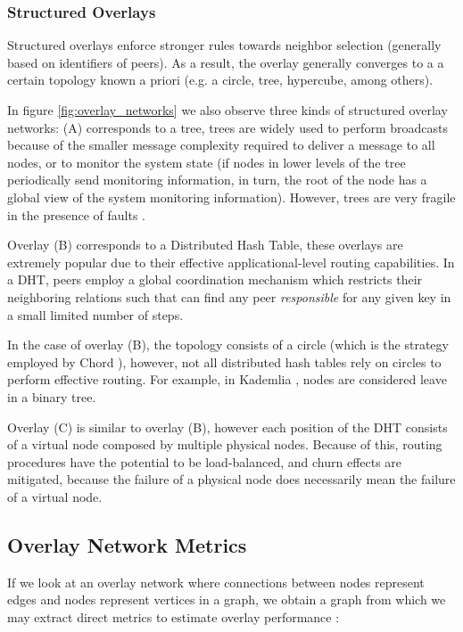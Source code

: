 \subsubsection*{Structured Overlays}

Structured overlays enforce stronger rules towards neighbor selection (generally based on identifiers of peers). As a result, the overlay generally converges to a a certain topology known a priori (e.g. a circle, tree, hypercube, among others). 

In figure \ref{fig:overlay_networks} we also observe three kinds of structured overlay networks: (A) corresponds to a tree, trees are widely used to perform broadcasts because of the smaller message complexity required to deliver a message to all nodes, or to monitor the system state (if nodes in lower levels of the tree periodically send monitoring information, in turn, the root of the node has a global view of the system monitoring information). However, trees are very fragile in the presence of faults \cite{leitao2007epidemic}.

Overlay (B) corresponds to a Distributed Hash Table, these overlays are extremely popular due to their effective applicational-level routing capabilities. In a DHT, peers employ a global coordination mechanism which restricts their neighboring relations such that can find any peer \textit{responsible} for any given key in a small limited number of steps.

In the case of overlay (B), the topology consists of a circle (which is the strategy employed by Chord \cite{stoica2003chord}), however, not all distributed hash tables rely on circles to perform effective routing. For example, in Kademlia \cite{maymounkov2002kademlia}, nodes are considered leave in a binary tree.

Overlay (C) is similar to overlay (B), however each position of the DHT consists of a virtual node composed by multiple physical nodes. Because of this, routing procedures have the potential to be load-balanced, and churn effects are mitigated, because the failure of a physical node does necessarily mean the failure of a virtual node.
 
\subsection{Overlay Network Metrics}

If we look at an overlay network where connections between nodes represent edges and nodes represent vertices in a graph, we obtain a graph from which we may extract direct metrics to estimate overlay performance \cite{leitaoPHDthesis}:


